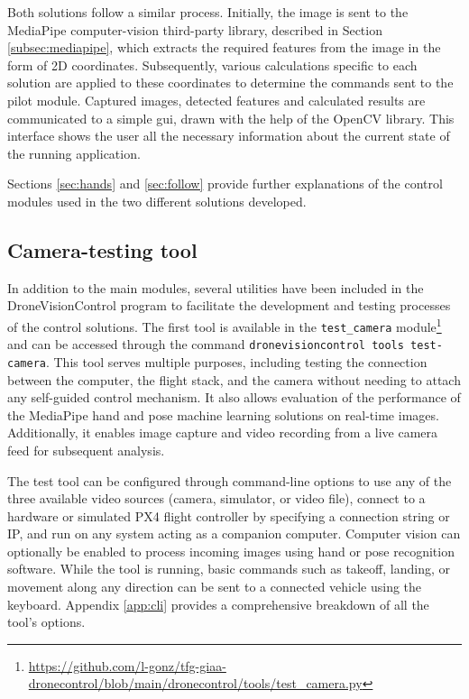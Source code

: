 Both solutions follow a similar process. Initially, the image is sent to the MediaPipe computer-vision third-party library, described in Section \ref{subsec:mediapipe}, which extracts the required features from the image in the form of 2D coordinates. Subsequently, various calculations specific to each solution are applied to these coordinates to determine the commands sent to the pilot module.
Captured images, detected features and calculated results are communicated to a simple \acrshort{gui}, drawn with the help of the OpenCV library. This interface shows the user all the necessary information about the current state of the running application.

Sections \ref{sec:hands} and \ref{sec:follow} provide further explanations of the control modules used in the two different solutions developed.

\subsection{Camera-testing tool}
\label{subsec:cam-tool}

In addition to the main modules, several utilities have been included in the DroneVisionControl program to facilitate the development and testing processes of the control solutions. The first tool is available in the \texttt{test\_camera} module\footnote{\url{https://github.com/l-gonz/tfg-giaa-dronecontrol/blob/main/dronecontrol/tools/test_camera.py}} and can be accessed through the command \texttt{dronevisioncontrol tools test-camera}. This tool serves multiple purposes, including testing the connection between the computer, the flight stack, and the camera without needing to attach any self-guided control mechanism. It also allows evaluation of the performance of the MediaPipe hand and pose machine learning solutions on real-time images. Additionally, it enables image capture and video recording from a live camera feed for subsequent analysis. 

The test tool can be configured through command-line options to use any of the three available video sources (camera, simulator, or video file), connect to a hardware or simulated PX4 flight controller by specifying a connection string or IP, and run on any system acting as a companion computer. Computer vision can optionally be enabled to process incoming images using hand or pose recognition software. While the tool is running, basic commands such as takeoff, landing, or movement along any direction can be sent to a connected vehicle using the keyboard. Appendix \ref{app:cli} provides a comprehensive breakdown of all the tool's options.


